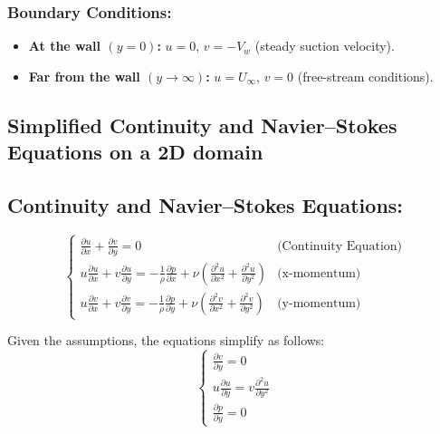 \documentclass{article}
\begin{document}
\subsubsection{Boundary Conditions:}
\begin{itemize}
    \item \textbf{At the wall \((y = 0)\):} \(u = 0\), \(v = -V_w\) (steady suction velocity).
    \item \textbf{Far from the wall \((y \rightarrow \infty)\):} \(u = U_\infty\), \(v = 0\) (free-stream conditions).
\end{itemize}

\subsection{Simplified Continuity and Navier–Stokes Equations on a 2D domain}

\subsection{Continuity and Navier–Stokes Equations:}
\[
\begin{cases}
    \frac{\partial u}{\partial x} + \frac{\partial v}{\partial y} = 0 & \text{(Continuity Equation)} \\
    u \frac{\partial u}{\partial x} + v \frac{\partial u}{\partial y} = -\frac{1}{\rho} \frac{\partial p}{\partial x} + \nu \left(\frac{\partial^2 u}{\partial x^2} + \frac{\partial^2 u}{\partial y^2}\right) & \text{(x-momentum)} \\
    u \frac{\partial v}{\partial x} + v \frac{\partial v}{\partial y} = -\frac{1}{\rho} \frac{\partial p}{\partial y} + \nu \left(\frac{\partial^2 v}{\partial x^2} + \frac{\partial^2 v}{\partial y^2}\right) & \text{(y-momentum)}
\end{cases}
\]

Given the assumptions, the equations simplify as follows:
\[
\begin{cases}
    \frac{\partial v}{\partial y} = 0 \\
    u \frac{\partial u}{\partial y} = v \frac{\partial^2 u}{\partial y^2} \\
    \frac{\partial p}{\partial y} = 0
\end{cases}
\]
\end{document}
